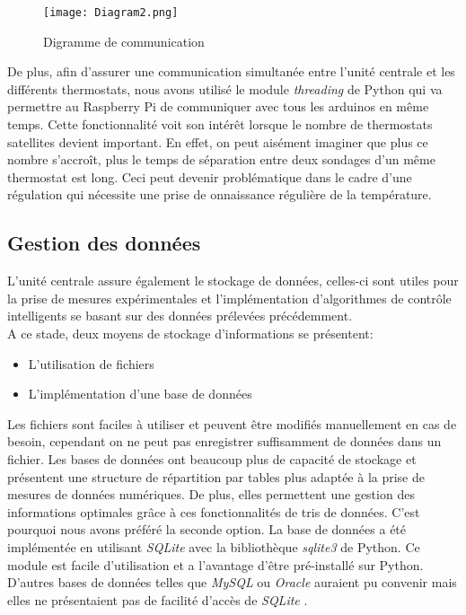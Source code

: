 \documentclass[12pt]{report}
\begin{document}
\noindent
\begin{figure}
\centering
\texttt{[image: Diagram2.png]}
\caption{\label{diagramme} Digramme de communication}
\end{figure}
De plus, afin d'assurer une communication simultanée entre l'unité centrale et les différents thermostats, nous avons utilisé le module \emph{threading} de Python qui va permettre au Raspberry Pi de communiquer avec tous les arduinos en même temps. Cette fonctionnalité voit son intérêt lorsque le nombre de thermostats satellites devient important. En effet, on peut aisément imaginer que plus ce nombre s'accroît, plus le temps de séparation entre deux sondages d'un même thermostat est long. Ceci peut devenir problématique dans le cadre d'une régulation qui nécessite une prise de onnaissance régulière de la température.


\subsection{Gestion des données}
L'unité centrale assure également le stockage de données, celles-ci sont utiles pour la prise de mesures expérimentales et l'implémentation d'algorithmes de contrôle intelligents se basant sur des données prélevées précédemment.\\
A ce stade, deux moyens de stockage d'informations se présentent:
\begin{itemize}
\item L'utilisation de fichiers
\item L'implémentation d'une base de données
\end{itemize}
Les fichiers sont faciles à utiliser et peuvent être modifiés manuellement en cas de besoin, cependant on ne peut pas enregistrer suffisamment de données dans un fichier.
Les bases de données ont beaucoup plus de capacité de stockage et présentent une structure de répartition par tables plus adaptée à la prise de mesures de données numériques. De plus, elles permettent une gestion des informations optimales grâce à ces fonctionnalités de tris de données. C'est pourquoi nous avons préféré la seconde option.
La base de données a été implémentée en utilisant \emph{SQLite} avec la bibliothèque \emph{sqlite3} de Python. Ce module est facile d'utilisation et a l'avantage d'être pré-installé sur Python. D'autres bases de données telles que \emph{MySQL} ou \emph{Oracle} auraient pu convenir mais elles ne présentaient pas de facilité d'accès de \emph{SQLite} \cite{_11.13._????}.\\
\end{document}

